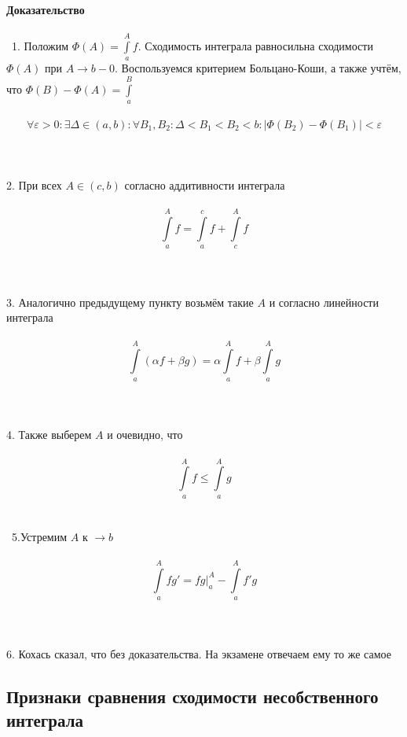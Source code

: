 \documentclass[../main.tex]{subfiles}
\begin{document}
\newpage
\textbf{Доказательство}\\\\\
1. Положим $\Phi(A) = \int\limits^A_a f$. Сходимость интеграла равносильна сходимости $\Phi(A)$ при $A \rightarrow b - 0$. Воспользуемся критерием Больцано-Коши, а также учтём, что $\Phi(B) - \Phi(A) = \int\limits^B_a$ \\\\
$$\forall \varepsilon > 0 : \exists \Delta \in (a, b) : \forall B_1, B_2 : \Delta < B_1 < B_2 < b : \left| \Phi(B_2) - \Phi(B_1) \right| < \varepsilon$$\\\\\\
2. При всех $A \in (c, b)$ согласно аддитивности интеграла\\\\          
$$\int\limits^A_a f = \int\limits^c_a f + \int\limits^A_c f$$\\\\\\
3. Аналогично предыдущему пункту возьмём такие $A$ и согласно линейности интеграла\\\\
$$\int\limits^A_a (\alpha f + \beta g) = \alpha \int\limits^A_a f + \beta \int\limits^A_a g$$\\\\\\
4. Также выберем $A$ и очевидно, что \\\\
$$\int\limits^A_a f \leq \int\limits^A_a g$$\\\\\
5.Устремим $A$ к $\rightarrow b$ \\\\
$$\int\limits^A_a fg' = fg \bigg|^A_a - \int\limits^A_a f'g$$\\\\\\
6. Кохась сказал, что без доказательства. На экзамене отвечаем ему то же самое

\newpage


\subsection{Признаки сравнения сходимости несобственного интеграла}
        
\end{document}
